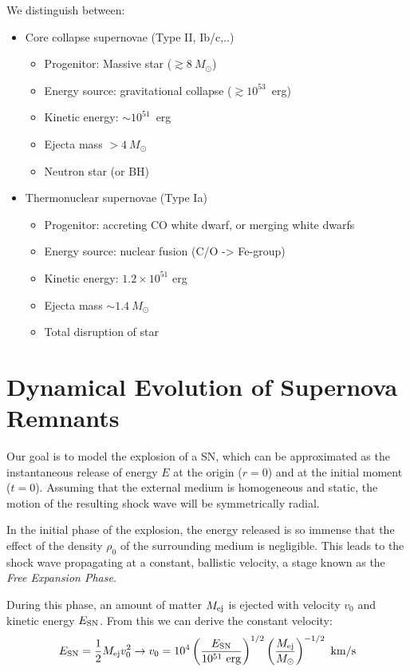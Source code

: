 We distinguish between: 
%
\begin{itemize}
\item Core collapse supernovae (Type II, Ib/c,..)
\begin{itemize}
\item Progenitor: Massive star (\( \gtrsim 8~M_\odot \))
\item Energy source: gravitational collapse (\( \gtrsim 10^{53} \)~erg) 
\item Kinetic energy: \( \sim 10^{51} \)~erg
\item Ejecta mass \( >4~M_\odot \)  
\item Neutron star (or BH)
\end{itemize}
\item Thermonuclear supernovae (Type Ia)
\begin{itemize}
\item Progenitor: accreting CO white dwarf, or merging white dwarfs 
\item Energy source: nuclear fusion (C/O -> Fe-group)
\item Kinetic energy: \( 1.2 \times 10^{51} \) erg
\item Ejecta mass \( \sim 1.4~M_\odot \)
\item Total disruption of star
\end{itemize}
\end{itemize}

\section{Dynamical Evolution of Supernova Remnants}

Our goal is to model the explosion of a SN, which can be approximated as the instantaneous release of energy \( E \) at the origin (\( r = 0 \)) and at the initial moment (\( t = 0 \)). Assuming that the external medium is homogeneous and static, the motion of the resulting shock wave will be symmetrically radial.

In the initial phase of the explosion, the energy released is so immense that the effect of the density \( \rho_0 \) of the surrounding medium is negligible. 
%
This leads to the shock wave propagating at a constant, ballistic velocity, a stage known as the \emph{Free Expansion Phase}.

During this phase, an amount of matter \( M_{\rm ej} \) is ejected with velocity \( v_0 \) and kinetic energy \( E_{\rm SN} \). From this we can derive the constant velocity:
%
\[
E_{\rm SN} = \frac{1}{2} M_{\rm ej} v_0^2 \rightarrow v_0 = 10^4 \left( \frac{E_{\rm SN}}{10^{51}~\text{erg}} \right)^{1/2} \left( \frac{M_{\rm ej}}{M_\odot} \right)^{-1/2}~\text{km/s}
\]

